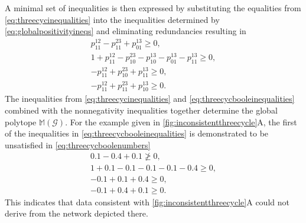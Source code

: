 A minimal set of inequalities is then expressed by substituting the equalities from \autoref{eq:threecycinequalities} into the inequalities determined by \autoref{eq:globalpositivityineqs} and eliminating redundancies resulting in
\begin{equation}
\begin{aligned}\label{eq:threecycbooleinequalities}
p^{12}_{11} - p^{23}_{11} + p^{13}_{01} \geq 0, \\
1 + p^{12}_{11} - p^{23}_{10} - p^{13}_{10} - p^{13}_{01} - p^{13}_{11} \geq 0, \\
-p^{12}_{11} + p^{23}_{10} + p^{13}_{11} \geq 0, \\
-p^{12}_{11} + p^{23}_{11} + p^{13}_{10} \geq 0.
\end{aligned}
\end{equation}
The inequalities from \autoref{eq:threecycinequalities} and \autoref{eq:threecycbooleinequalities} combined with the nonnegativity inequalities together determine the global polytope $\mathbb{M}(\mathcal{G})$. For the example given in \autoref{fig:inconsistentthreecycle}A, the first of the inequalities in \autoref{eq:threecycbooleinequalities} is demonstrated to be unsatisfied in \autoref{eq:threecycboolenumbers}
\begin{equation}
\begin{aligned}\label{eq:threecycboolenumbers}
0.1 - 0.4 + 0.1 \not\geq 0, \\
1 + 0.1 - 0.1 - 0.1 - 0.1 - 0.4 \geq 0, \\
-0.1 + 0.1 + 0.4 \geq 0, \\
-0.1 + 0.4 + 0.1 \geq 0.
\end{aligned}
\end{equation}
This indicates that data consistent with \autoref{fig:inconsistentthreecycle}A could not derive from the network depicted there.
